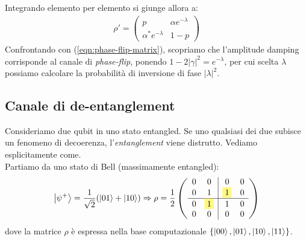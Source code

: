 \documentclass[../../InformazioneQuantistica.tex]{subfiles}
\begin{document}
Integrando elemento per elemento si giunge allora a:
\begin{align*}
\rho'= \begin{pmatrix} p & \alpha e^{-\lambda}\\
\alpha^*e^{-\lambda} & 1-p \end{pmatrix}
\end{align*}
Confrontando con (\ref{eqn:phase-flip-matrix}), scopriamo che l'amplitude damping corrisponde al canale di \textit{phase-flip}, ponendo $1-2|\gamma|^2 = e^{-\lambda}$, per cui scelta $\lambda$ possiamo calcolare la probabilità di inversione di fase $|\lambda|^2$.


\subsection{Canale di de-entanglement}
Consideriamo due qubit in uno stato entangled. Se uno qualsiasi dei due subisce un fenomeno di decoerenza, l'\textit{entanglement} viene distrutto. Vediamo esplicitamente come.\\

Partiamo da uno stato di Bell (massimamente entangled):
\begin{align*}
\ket{\psi^+} = \frac{1}{\sqrt{2}}(\ket{01}+\ket{10}) \Rightarrow \rho=\frac{1}{2}\left(
\begin{array}{cc|cc}
0 & 0 & 0 & 0\\
0 & 1 & \hlc{Yellow}{1} & 0\\ \hline
0 & \hlc{Yellow}{1} & 1 & 0\\
0 & 0 & 0 & 0
\end{array}
\right)
\end{align*}
dove la matrice $\rho$ è espressa nella base computazionale $\{\Ket{00}, \Ket{01}, \Ket{10}, \Ket{11}\}$.\\
\end{document}
